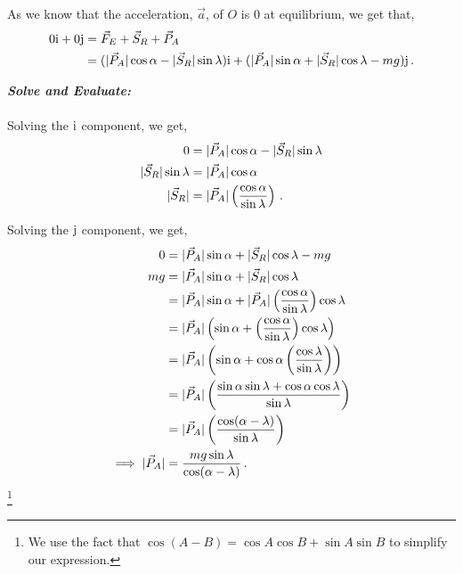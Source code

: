 \begin{subquestions}
\begin{subsubquestions}
	As we know that the acceleration, $\vec{a}$, of $O$ is 0 at equilibrium, we get that,
	\begin{align}
		0\mathrm{i} + 0\mathrm{j} & = \vec{F}_{E} + \vec{S}_{R} + \vec{P}_{A} \nonumber \\
                        & = (|\vec{P}_{A}|\cos{\alpha} - |\vec{S}_{R}|\sin{\lambda})\mathrm{i} + (|\vec{P}_{A}|\sin{\alpha} + |\vec{S}_{R}|\cos{\lambda} - mg)\mathrm{j} \,.		
	\end{align}



	\textbf{\textit{Solve and Evaluate:}} \\ \\
	Solving the $\mathrm{i}$ component, we get,
	\begin{align}
		0 & = |\vec{P}_{A}|\cos{\alpha} - |\vec{S}_{R}|\sin{\lambda} \nonumber \\
		|\vec{S}_{R}|\sin{\lambda} & = |\vec{P}_{A}|\cos{\alpha} \nonumber \\
		|\vec{S}_{R}| & = |\vec{P}_{A}| \left(\frac{\cos{\alpha}}{\sin{\lambda}}\right) \,.
	\end{align}
	
	Solving the $\mathrm{j}$ component, we get,
	\begin{align}
		0 & = |\vec{P}_{A}|\sin{\alpha} + |\vec{S}_{R}|\cos{\lambda} - mg \nonumber \\
		mg & = |\vec{P}_{A}|\sin{\alpha} + |\vec{S}_{R}|\cos{\lambda} \nonumber \\
		 & = |\vec{P}_{A}|\sin{\alpha} + |\vec{P}_{A}|\left(\frac{\cos{\alpha}}{\sin{\lambda}}\right)\cos{\lambda} \nonumber \\
		 & = |\vec{P}_{A}|\left(\sin{\alpha} + \left(\frac{\cos{\alpha}}{\sin{\lambda}}\right)\cos{\lambda}\right) \nonumber \\
		 & = |\vec{P}_{A}|\left(\sin{\alpha} + \cos{\alpha}\left(\frac{\cos{\lambda}}{\sin{\lambda}}\right)\right) \nonumber \\
		 & = |\vec{P}_{A}|\left(\frac{\sin{\alpha}\sin{\lambda}+\cos{\alpha}\cos{\lambda}}{\sin{\lambda}}\right) \nonumber \\
		 & = |\vec{P}_{A}|\left(\frac{\cos(\alpha - \lambda)}{\sin{\lambda}}\right) \nonumber \\
		\implies |\vec{P}_{A}| & = \frac{mg \sin{\lambda}}{\cos(\alpha-\lambda)} \,.
	\end{align} \footnote{We use the fact that $\cos(A-B)=\cos{A}\cos{B} + \sin{A}\sin{B}$ to simplify our expression.}


\end{subsubquestions}
\end{subquestions}
